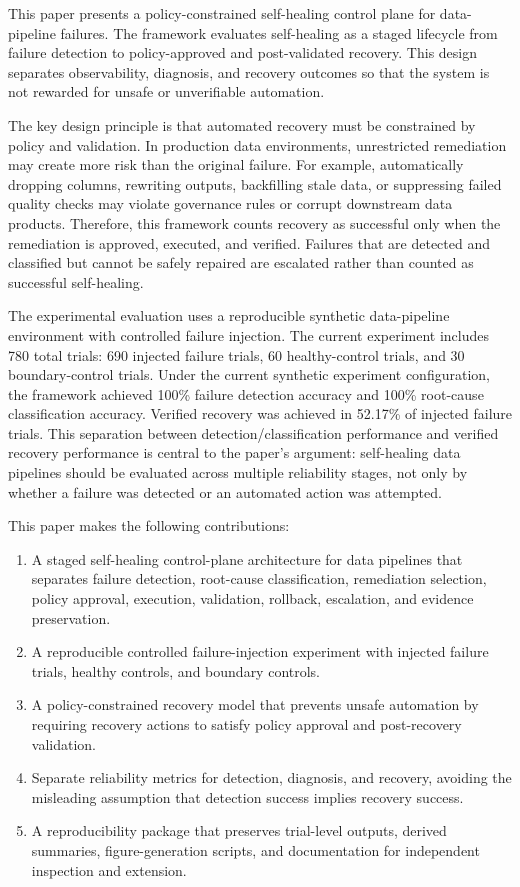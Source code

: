 This paper presents a policy-constrained self-healing control plane for data-pipeline failures. The framework evaluates self-healing as a staged lifecycle from failure detection to policy-approved and post-validated recovery. This design separates observability, diagnosis, and recovery outcomes so that the system is not rewarded for unsafe or unverifiable automation.

The key design principle is that automated recovery must be constrained by policy and validation. In production data environments, unrestricted remediation may create more risk than the original failure. For example, automatically dropping columns, rewriting outputs, backfilling stale data, or suppressing failed quality checks may violate governance rules or corrupt downstream data products. Therefore, this framework counts recovery as successful only when the remediation is approved, executed, and verified. Failures that are detected and classified but cannot be safely repaired are escalated rather than counted as successful self-healing.

The experimental evaluation uses a reproducible synthetic data-pipeline environment with controlled failure injection. The current experiment includes 780 total trials: 690 injected failure trials, 60 healthy-control trials, and 30 boundary-control trials. Under the current synthetic experiment configuration, the framework achieved 100\% failure detection accuracy and 100\% root-cause classification accuracy. Verified recovery was achieved in 52.17\% of injected failure trials. This separation between detection/classification performance and verified recovery performance is central to the paper's argument: self-healing data pipelines should be evaluated across multiple reliability stages, not only by whether a failure was detected or an automated action was attempted.

This paper makes the following contributions:

\begin{enumerate}
\item A staged self-healing control-plane architecture for data pipelines that separates failure detection, root-cause classification, remediation selection, policy approval, execution, validation, rollback, escalation, and evidence preservation.
\item A reproducible controlled failure-injection experiment with injected failure trials, healthy controls, and boundary controls.
\item A policy-constrained recovery model that prevents unsafe automation by requiring recovery actions to satisfy policy approval and post-recovery validation.
\item Separate reliability metrics for detection, diagnosis, and recovery, avoiding the misleading assumption that detection success implies recovery success.
\item A reproducibility package that preserves trial-level outputs, derived summaries, figure-generation scripts, and documentation for independent inspection and extension.
\end{enumerate}

